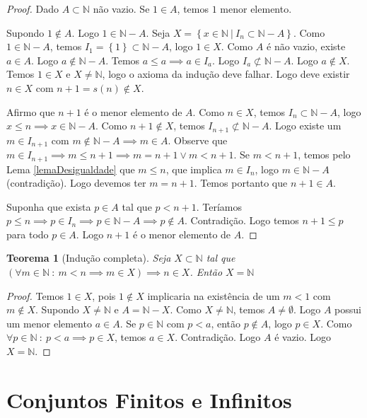 \documentclass{article}
\theoremstyle{plain}
\newtheorem{teo}{Teorema}
\theoremstyle{definition}
\theoremstyle{remark}
\begin{document}
\begin{proof}
	Dado $A\subset \mathbb{N}$ não vazio. Se $1\in A$, temos $1$ menor elemento.  

	Supondo $1\not \in A$. Logo $1\in \mathbb{N} - A$.  Seja $X = \left\{ x \in \mathbb{N} \: | \:  I_n \subset \mathbb{N} - A \right\}$.   Como $1\in \mathbb{N} - A$, temos $I_1 = \left\{1\right\} \subset \mathbb{N} - A$, logo $1 \in X$.   Como  $A$ é não vazio, existe $a\in A$. Logo $a\not \in \mathbb{N} -A$.  Temos $a\leq a \implies a\in I_a$. Logo $I_a \not \subset \mathbb{N} - A$.   Logo $a \not \in X$. Temos $1 \in X$ e $X\neq \mathbb{N}$, logo o axioma da indução deve falhar. Logo deve existir $n\in X$ com $n+1 = s(n)\not \in X$. 

	Afirmo que $n+1$ é o menor elemento de $A$.  Como $n\in X$, temos $I_n \subset \mathbb{N} - A$, logo $x \leq n \implies x \in \mathbb{N} - A$. Como $n+1\not \in X$, temos $I_{n+1} \not \subset \mathbb{N} - A$.  Logo existe um $m \in I_{n+1}$ com $m\not \in \mathbb{N} - A\implies m  \in A$. Observe que $m\in I_{n+1} \implies m \leq n+1 \implies m = n+1 \lor m<n+1$. Se $m < n+1$, temos pelo Lema \ref{lemaDesigualdade} que $m\leq n$, que implica $m\in I_{n}$, logo $m\in \mathbb{N} - A$ (contradição). Logo devemos ter $m = n+1$. Temos portanto que $n+1\in A$. 


	Suponha que exista $p \in A$ tal que $p < n+1$.  Teríamos $p\leq n \implies p \in I_n \implies p \in \mathbb{N} -A \implies p \not \in A$. Contradição. Logo temos $n+1\leq p$ para todo $p\in A$. Logo $n+1$ é o menor elemento de $A$.
\end{proof}
\begin{teo}[Indução completa]
	Seja $X \subset \mathbb{N}$ tal que $( \forall m \in \mathbb{N} \: : \: m < n \implies m\in X) \implies n \in X $. Então $X = \mathbb{N}$
\end{teo}
\begin{proof}
	Temos $1 \in X$, pois $1\not \in X$ implicaria na existência de um $m < 1$ com $m\not \in X$.    Supondo $X\neq \mathbb{N}$ e $A = \mathbb{N} - X$. Como $X\neq \mathbb{N}$, temos $A \neq \emptyset$. Logo $A$ possui um menor elemento $a\in A$.  Se $p\in \mathbb{N}$ com $p < a $, então $p \not \in A$, logo $p\in X$. Como $ \forall p \in \mathbb{N} \: : \: p < a \implies p \in X$, temos $a \in X$. Contradição. Logo $A$ é vazio. Logo $X = \mathbb{N}$.
\end{proof}


\section{Conjuntos Finitos e Infinitos}
\end{document}

